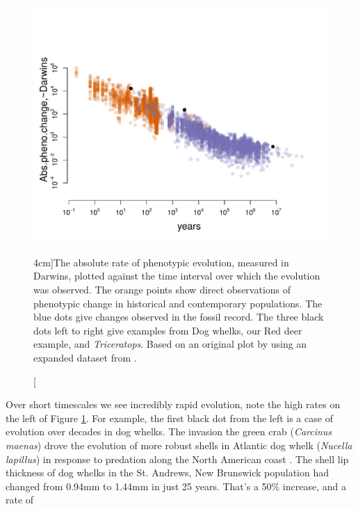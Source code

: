 \begin{figure}
  \begin{center}
    \includegraphics[width= \textwidth]{Journal_figs/Quant_gen/Uyeda_evol_rates/Uyeda_evol_rates.pdf}
\end{center}
\caption[][4cm]{The absolute rate of phenotypic evolution, measured in
  Darwins, plotted against the time interval over which the evolution
  was observed. The orange points show direct observations of
  phenotypic change in historical and contemporary populations. The
  blue dots give changes observed in the fossil record. The three
  black dots left to right give examples from Dog whelks, our Red deer example, and  {\it Triceratops}. Based on an original plot by
  \citet{gingerich1983rates} using an expanded dataset from
  \citet{uyeda2011million}. } \label{fig:uyeda_gingerich}  
\end{figure}
Over short timescales we see incredibly rapid evolution, note the high
rates on the left of Figure \ref{fig:uyeda_gingerich}.
For example, the first black dot from the left is a case of evolution
over decades in dog whelks. The invasion the green crab ({\it Carcinus maenas})
drove the evolution of more robust shells in Atlantic dog
whelk ({\it Nucella lapillus}) in response to predation
along the North American coast \citep{vermeij1982phenotypic}. The shell lip thickness of dog whelks
in the St. Andrews, New Brunswick population had changed from 0.94mm
to 1.44mm in just 25 years. That's a 50\% increase, and a rate of

